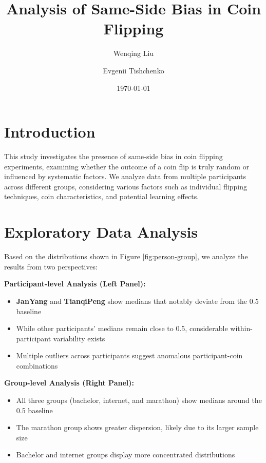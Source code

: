 \documentclass[12pt,a4paper]{article}
\title{Analysis of Same-Side Bias in Coin Flipping}
\author{Wenqing Liu \and Evgenii Tishchenko}
\date{\today}
\begin{document}
\maketitle

\section{Introduction}
This study investigates the presence of same-side bias in coin flipping experiments, examining whether the outcome of a coin flip is truly random or influenced by systematic factors. We analyze data from multiple participants across different groups, considering various factors such as individual flipping techniques, coin characteristics, and potential learning effects.

\section{Exploratory Data Analysis}
Based on the distributions shown in Figure \ref{fig:person-group}, we analyze the results from two perspectives:

\textbf{Participant-level Analysis (Left Panel):}
\begin{itemize}
    \item \textbf{JanYang} and \textbf{TianqiPeng} show medians that notably deviate from the 0.5 baseline
    \item While other participants' medians remain close to 0.5, considerable within-participant variability exists
    \item Multiple outliers across participants suggest anomalous participant-coin combinations
\end{itemize}

\textbf{Group-level Analysis (Right Panel):}
\begin{itemize}
    \item All three groups (bachelor, internet, and marathon) show medians around the 0.5 baseline
    \item The marathon group shows greater dispersion, likely due to its larger sample size
    \item Bachelor and internet groups display more concentrated distributions
\end{itemize}
\end{document}
